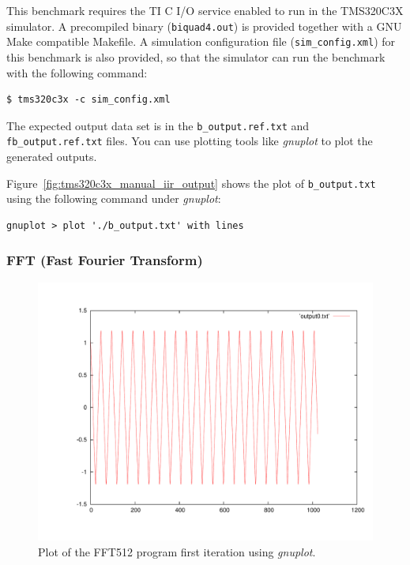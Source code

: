 This benchmark requires the TI C I/O service enabled to run in the TMS320C3X simulator.
A precompiled binary (\texttt{biquad4.out}) is provided together with a GNU Make compatible Makefile.
A simulation configuration file (\texttt{sim\_config.xml}) for this benchmark is also provided, so that the simulator can run the benchmark with the following command:
  
\begin{verbatim}
$ tms320c3x -c sim_config.xml
\end{verbatim}

The expected output data set is in the \texttt{b\_output.ref.txt} and \texttt{fb\_output.ref.txt} files.
You can use plotting tools like \textit{gnuplot} to plot the generated outputs. 

Figure~\ref{fig:tms320c3x_manual_iir_output} shows the plot of \texttt{b\_output.txt} using the following command under \textit{gnuplot}:

\begin{verbatim}
gnuplot > plot './b_output.txt' with lines
\end{verbatim}

\subsubsection{FFT (Fast Fourier Transform)}

\begin{figure}[!h]
	\begin{center}
		\includegraphics[width=.8\textwidth]{tms320c3x/fig_fft512_output0.pdf}
		\caption{\label{fig:tms320c3x_manual_fft_output0}Plot of the FFT512 program first iteration using \textit{gnuplot}.}
	\end{center}
\end{figure}

